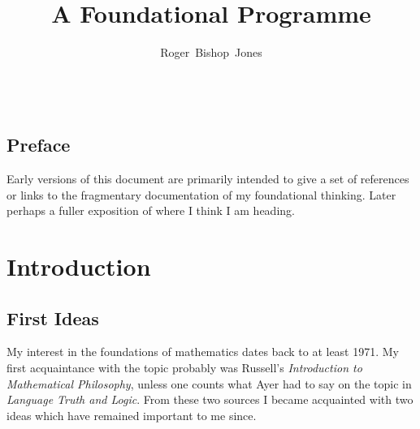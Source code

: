 \documentclass[10pt,titlepage]{book}
\title{A Foundational Programme}
\author{Roger~Bishop~Jones}
\date{\ }
\newcommand{\ignore}[1]{}
\begin{document}
\frontmatter
                               
\begin{titlepage}
\maketitle

\ignore{
\vfill


\begin{centering}

{\footnotesize

\copyright\ Roger~Bishop~Jones;
}%

\end{centering}
}%

\end{titlepage}

\setcounter{tocdepth}{2}
{\parskip-0pt\tableofcontents}


\mainmatter


\section*{Preface}

Early versions of this document are primarily intended to give a set of references or links to the fragmentary documentation of my foundational thinking.
Later perhaps a fuller exposition of where I think I am heading.

\chapter{Introduction}

\section{First Ideas}

My interest in the foundations of mathematics dates back to at least 1971.
My first acquaintance with the topic probably was Russell's \emph{Introduction to Mathematical Philosophy}\cite{russell1919}, unless one counts what Ayer had to say on the topic in \emph{Language Truth and Logic}\cite{ayer1936}.
From these two sources I became acquainted with two ideas which have remained important to me since.
\end{document}
